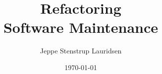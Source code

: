 \documentclass[12pt]{article}
\title{%
Refactoring \\
\large Software Maintenance}
\author{Jeppe Stenstrup Lauridsen}
\date{\today}
\begin{document}
\begin{titlepage}
\clearpage\maketitle
\thispagestyle{empty}
\end{titlepage}


\end{document}
